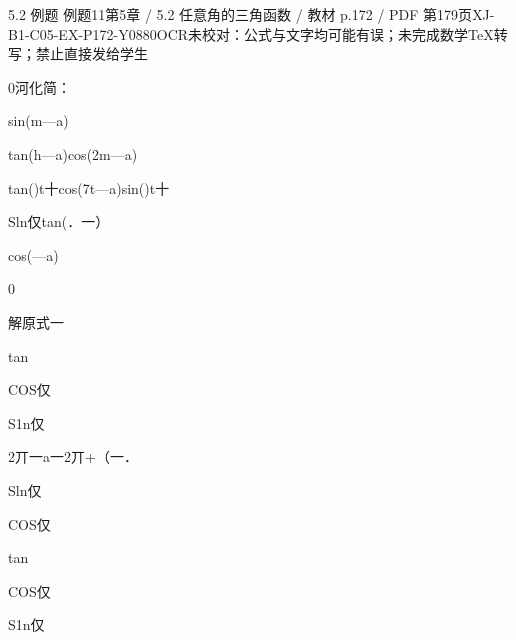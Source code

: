 \begin{bankitem}{5.2 例题 例题11}{第5章 / 5.2 任意角的三角函数 / 教材 p.172 / PDF 第179页}{XJ-B1-C05-EX-P172-Y0880}{OCR未校对：公式与文字均可能有误；未完成数学TeX转写；禁止直接发给学生}
\begin{ocrdraft}
\par
0河化简：
\par
sin(m—a)
\par
tan(h—a)cos(2m—a)
\par
tan()t十cos(7t—a)sin()t十
\par
Sln仅tan(．一）
\par
cos(—a)
\par
0
\par
解原式一
\par
tan
\par
COS仅
\par
S1n仅
\par
2丌一a一2丌+（一．
\par
Sln仅
\par
COS仅
\par
tan
\par
COS仅
\par
S1n仅
\end{ocrdraft}
\end{bankitem}
